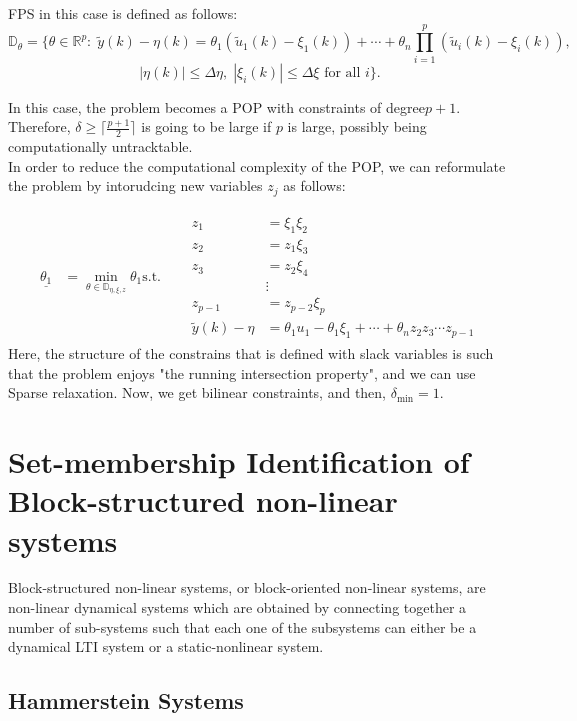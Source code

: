 FPS in this case is defined as follows:
\[
\mathbb{D}_\theta = \{ \theta \in \mathbb{R}^p :\; \tilde{y}(k) - \eta(k) = \theta_1 (\tilde{u}_1(k) - \xi_1(k)) + \cdots + \theta_n \prod_{i=1}^p (\tilde{u}_i(k) - \xi_i(k)),
\]
\[
|\eta(k)| \leq \Delta \eta, \; |\xi_i(k)| \leq \Delta \xi \text{ for all } i \}.
\]

In this case, the problem becomes a POP with constraints of degree$p+1$. Therefore, $\delta \geq \lceil \frac{p+1}{2} \rceil
 $ is going to be large if $p$ is large, possibly being computationally untracktable.\\
 
 In order to reduce the computational complexity of the POP, we can reformulate the problem by intorudcing new variables $z_j$ as follows:
 
 
\[
\begin{aligned}
\underline{\theta_1} &= \min\limits_{\theta \in \mathbb{D}_{\eta,\xi,z}} \theta_1 
\text{s.t.} \quad & \begin{aligned}
    z_1 &= \xi_1 \xi_2 \\
    z_2 &= z_1 \xi_3 \\
    z_3 &= z_2 \xi_4 \\
    &\vdots \\
    z_{p-1} &= z_{p-2} \xi_p \\
    \tilde{y}(k) - \eta &= \theta_1 u_1 - \theta_1 \xi_1 + \cdots + \theta_n z_2 z_3 \cdots z_{p-1}
\end{aligned}
\end{aligned}
\]
Here, the structure of the constrains that is defined with slack variables is such that the problem enjoys "the running intersection property", and we can use Sparse relaxation.
Now, we get bilinear constraints, and then, \(\delta_{\text{min}} = 1\).

\section{Set-membership Identification of Block-structured non-linear systems}
Block-structured non-linear systems, or block-oriented non-linear systems, are non-linear dynamical systems which are obtained by connecting together a number of sub-systems such that each one of the subsystems can either be a dynamical LTI system or a static-nonlinear system.
\subsection{Hammerstein Systems}

